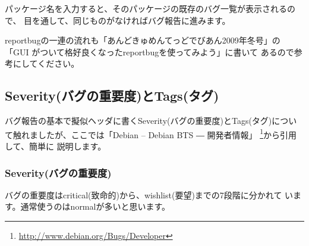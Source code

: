 \documentclass[mingoth,a4paper]{jsarticle}
\begin{document}

パッケージ名を入力すると、そのパッケージの既存のバグ一覧が表示されるので、
目を通して、同じものがなければバグ報告に進みます。

reportbugの一連の流れも「あんどきゅめんてっどでびあん2009年冬号」の「GUI
がついて格好良くなったreportbugを使ってみよう」\cite{nogata2009}に書いて
あるので参考にしてください。

\subsection{Severity(バグの重要度)とTags(タグ)}
バグ報告の基本で擬似ヘッダに書くSeverity(バグの重要度)とTags(タグ)につい
て触れましたが、ここでは「Debian -- Debian BTS ― 開発者情報」
\footnote{\url{http://www.debian.org/Bugs/Developer}}から引用して、簡単に
説明します。

\subsubsection{Severity(バグの重要度)}
バグの重要度はcritical(致命的)から、wishlist(要望)までの7段階に分かれて
います。通常使うのはnormalが多いと思います。
\end{document}
